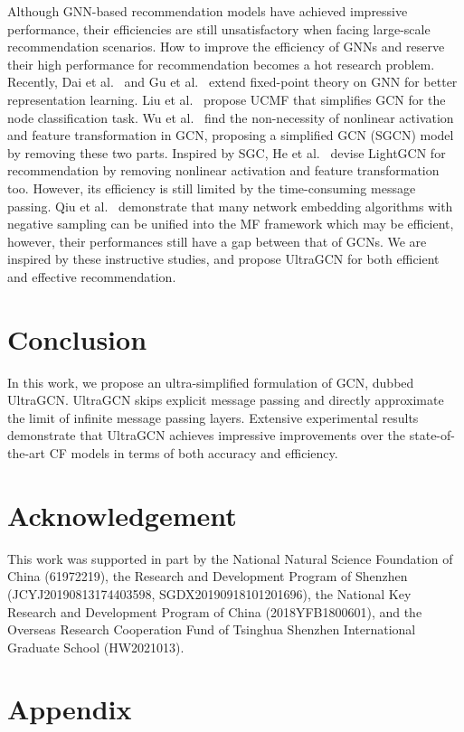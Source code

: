 \documentclass[sigconf,authorversion]{acmart}
\begin{document}
Although GNN-based recommendation models have achieved impressive performance, their efficiencies are still unsatisfactory when facing large-scale recommendation scenarios. How to improve the efficiency of GNNs and reserve their high performance for recommendation becomes a hot research problem. Recently,  Dai et al.~\cite{fixed_point_GNN_dai} and Gu et al.~\cite{implicitGNN} extend fixed-point theory on GNN for better representation learning. Liu et al.~\cite{UCMF} propose UCMF that simplifies GCN for the node classification task.
Wu et al.~\cite{SGCN} find the non-necessity of nonlinear activation and feature transformation in GCN, proposing a simplified GCN (SGCN) model by removing these two parts. Inspired by SGC, He et al.~\cite{LightGCN} devise LightGCN for recommendation by removing nonlinear activation and feature transformation too. However, its efficiency is still limited by the time-consuming message passing. Qiu et al.~\cite{unify_network_embedding} demonstrate that many network embedding algorithms with negative sampling can be unified into the MF framework which may be efficient, however, their performances still have a gap between that of GCNs.
We are inspired by these instructive studies, and propose UltraGCN for both efficient and effective recommendation.  













 \vspace{-1.5ex}
\section{Conclusion}
In this work, we propose an ultra-simplified formulation of GCN, dubbed UltraGCN. UltraGCN skips explicit message passing and directly approximate the limit of infinite message passing layers. 
Extensive experimental results demonstrate that UltraGCN achieves impressive improvements over the state-of-the-art CF models in terms of both accuracy and efficiency.



\section{Acknowledgement}
This work was supported in part by the National Natural Science Foundation of China (61972219), the Research and Development Program of Shenzhen (JCYJ20190813174403598, SGDX20190918101201696), the National Key Research and Development Program of China (2018YFB1800601), and the Overseas Research Cooperation Fund of Tsinghua Shenzhen International Graduate School
(HW2021013). \section{Appendix}
\end{document}
